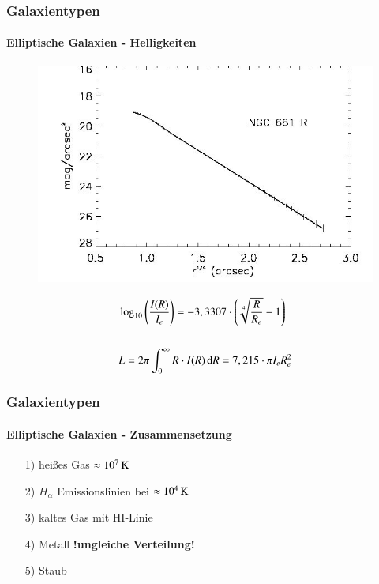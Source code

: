 \begin{frame}
\frametitle{Galaxientypen}
\framesubtitle{Elliptische Galaxien - Helligkeiten}

\begin{figure}
\includegraphics[scale=0.25]{Helligkeitsprofil_Ellipse.jpg}
\end{figure}


\begin{align*}
&\log_{10} \left( \frac{I(R)}{I_e} \right) = - 3,3307 \cdot \left( \sqrt[4]{\frac{R}{R_e}}  - 1 \right) \\
\hfill \\
&L = 2\pi \int_0^\infty R \cdot I(R) \d R = 7,215 \cdot \pi I_e R_e^2
\end{align*}

\end{frame}


\begin{frame}
\frametitle{Galaxientypen}
\framesubtitle{Elliptische Galaxien - Zusammensetzung}

\begin{itemize}
\item[1)] heißes Gas $\approx \unit[10^7]{K}$ \\
\item[2)] $H_\alpha$ Emissionslinien bei $\approx \unit[10^4]{K}$
\item[3)] kaltes Gas mit HI-Linie
\item[4)] Metall \textbf{!ungleiche Verteilung!}
\item[5)] Staub 
\end{itemize}

\end{frame}


